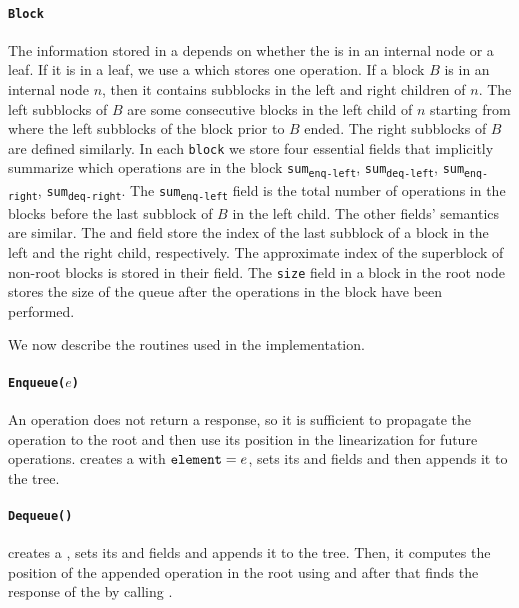 \paragraph{\tt{Block}}
 The information stored in a  depends on whether  the
  is in an internal node or a leaf. If it is in a leaf, we
 use a  which stores one operation. If a block $B$ is in
 an internal node $n$, then it contains subblocks in the left and
 right children of $n$. The left subblocks of $B$ are some consecutive
 blocks in the left child of $n$ starting from where the left
 subblocks of the block prior to $B$ ended. The right subblocks of $B$
 are defined similarly. In each \texttt{block} we store four essential
 fields that implicitly summarize which operations are in the block
 \texttt{sum\textsubscript{enq-left}},
 \texttt{sum\textsubscript{deq-left}},
 \texttt{sum\textsubscript{enq-right}},
 \texttt{sum\textsubscript{deq-right}}. The
 \texttt{sum\textsubscript{enq-left}} field is the total number of
  operations in the blocks before the last subblock of $B$
 in the left child. The other fields' semantics are similar. The
  and  field store the index of
 the last subblock of a block in the left and the right child,
 respectively. The approximate index of the superblock of non-root
 blocks is stored in their  field. The \texttt{size} field
 in a block in the root node stores the size of the queue after the
 operations in the block have been performed.  

We now describe the routines used in the implementation.

\paragraph{\tt{Enqueue($e$)}}
An  operation does not return a response, so it is
sufficient to propagate the  operation to the root and
then use its position in the linearization for future 
operations.  creates a  with
${\normalfont{\texttt{element}}}=e$, sets its  and 
fields and then appends it to the tree. 

\paragraph{\tt{Dequeue()}}
 creates a , sets its  and
 fields and appends it to the tree. Then, it computes
the position of the appended  operation in the root using
 and after that finds the response of the
 by calling . 

